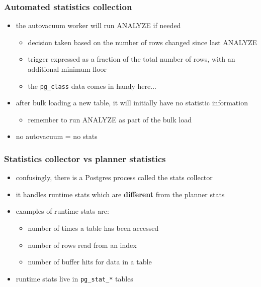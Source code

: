 \documentclass{beamer}
\begin{document}
\begin{frame}
  \frametitle{Automated statistics collection}

  \begin{itemize}
  \item the \alert{autovacuum worker} will run ANALYZE if needed
    \begin{itemize}
    \item decision taken based on the number of \alert{rows changed} since last
      ANALYZE
    \item trigger expressed as a \alert{fraction} of the total number of rows,
      with an additional \alert{minimum} floor
    \item the \texttt{pg\_class} data comes in handy here...
    \end{itemize}
  \item after \alert{bulk loading} a new table, it will initially have no
    statistic information
    \begin{itemize}
    \item remember to \alert{run ANALYZE} as part of the bulk load
    \end{itemize}
  \item no autovacuum = \alert{no stats}
  \end{itemize}
\end{frame}

\begin{frame}
  \frametitle{Statistics collector vs planner statistics}

  \begin{itemize}
  \item confusingly, there is a Postgres process called the \alert{stats
    collector}
  \item it handles \alert{runtime} stats which are \textbf{different} from the
    \alert{planner} stats
  \item examples of runtime stats are:
    \begin{itemize}
    \item number of times a table has been \alert{accessed}
    \item number of \alert{rows read} from an index
    \item number of \alert{buffer hits} for data in a table
    \end{itemize}
  \item runtime stats live in \texttt{pg\_stat\_*} tables
  \end{itemize}
\end{frame}
\end{document}
